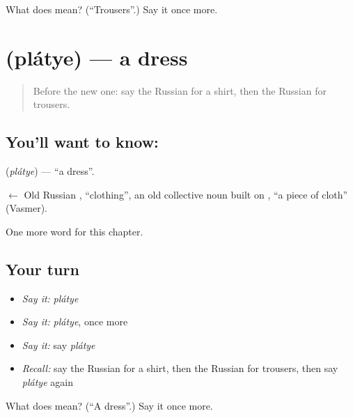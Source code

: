 \begin{tcolorbox}[breakable,colback=teal!4,colframe=teal!35!black,title={Before you move on}]
What does  mean? (\textquotedblleft{}Trousers\textquotedblright{}.) Say it once more.
\end{tcolorbox}
\section[\texorpdfstring{\ru{платье} (plátye)}{платье (plátye)}]{ (plátye) — a dress}

\label{lesson:RU-C103-dress}



\begin{quote}
Before the new one: say the Russian for a shirt, then the Russian for trousers.
\end{quote}

\subsection*{You'll want to know: }
\textbf{} (\emph{plátye}) — \textquotedblleft{}a dress\textquotedblright{}.

\begin{cousinweb}
\textbf{} $\leftarrow$ Old Russian \emph{}, \textquotedblleft{}clothing\textquotedblright{}, an old collective noun built on \emph{}, \textquotedblleft{}a piece of cloth\textquotedblright{} (Vasmer).
\end{cousinweb}

\begin{grammarlens}[title={What you've built}]
One more word for this chapter.
\end{grammarlens}

\subsection*{Your turn}
\begin{itemize}
\raggedright
  \item \emph{Say it:} \emph{plátye}
  \item \emph{Say it:} \emph{plátye}, once more
  \item \emph{Say it:} say \emph{plátye}
  \item \emph{Recall:} say the Russian for a shirt, then the Russian for trousers, then say \emph{plátye} again
\end{itemize}

\begin{tcolorbox}[breakable,colback=teal!4,colframe=teal!35!black,title={Before you move on}]
What does  mean? (\textquotedblleft{}A dress\textquotedblright{}.) Say it once more.
\end{tcolorbox}

